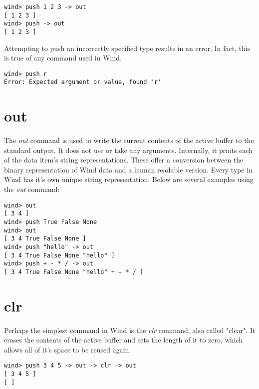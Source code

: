 \begin{verbatim}
wind> push 1 2 3 -> out
[ 1 2 3 ]
wind> push -> out
[ 1 2 3 ]
\end{verbatim}

\par Attempting to push an incorrectly specified type results in an error. In fact, this is true of any command used in Wind.

\begin{verbatim}
wind> push r
Error: Expected argument or value, found 'r'
\end{verbatim}

\section{out}

\paragraph{  } The \emph{out} command is used to write the current contents of the active buffer to the standard output. It does not use or take any arguments. Internally, it prints each of the data item's string representations. These offer a conversion between the binary representation of Wind data and a human readable version. Every type in Wind has it's own unique string representation. Below are several examples using the \emph{out} command: \\

\begin{verbatim}
wind> out 
[ 3 4 ]
wind> push True False None
wind> out
[ 3 4 True False None ]
wind> push "hello" -> out
[ 3 4 True False None "hello" ]
wind> push + - * / -> out
[ 3 4 True False None "hello" + - * / ]
\end{verbatim}

\section{clr}

\paragraph{  } Perhaps the simplest command in Wind is the \emph{clr} command, also called "clear". It erases the contents of the active buffer and sets the length of it to zero, which allows all of it's space to be reused again. \\

\begin{verbatim}
wind> push 3 4 5 -> out -> clr -> out
[ 3 4 5 ]
[ ]
\end{verbatim}

